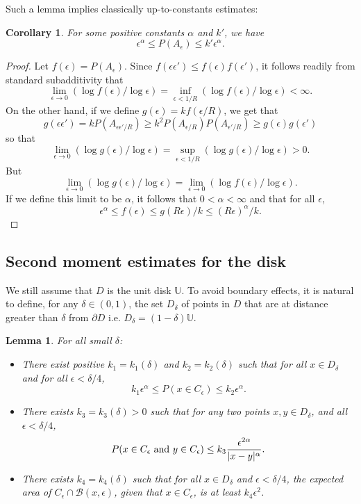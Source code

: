\documentclass[11pt]{article}
\newcommand{\U}{{\mathbb U}}
\newtheorem {lemma} [Theorem]    {Lemma}
\newtheorem {corollary}  [Theorem]    {Corollary}
\newcommand{\eps}{\epsilon}
\newcommand{\PP}{{ P}}
\newcommand{\pa}[1]{\PP (A_{#1})}
\newcommand{\B}{{\mathcal B}}
\begin{document}
Such a lemma implies classically up-to-constants estimates:

\begin{corollary}\label{pa_alpha_zero}
For some positive constants $\alpha$ and $k'$, we have
\begin{equation}
\eps^\alpha \le \PP (A_\eps) \le  k' \eps^\alpha. 
\end{equation}
\end{corollary}

\begin {proof}
Let $f(\eps) = \PP(A_\eps)$. Since $f( \eps \eps') \le f ( \eps) f( \eps')$, 
it follows readily from standard subadditivity that 
$$\lim_{\eps \to 0} (\log f( \eps) / \log \eps)= \inf_{\eps< 1/R} (\log f( \eps) / \log \eps) < \infty.$$
On the other hand, if we define $g (\eps) = k f ( \eps/R)$, we get that
$$ g ( \eps \eps') = k \pa{\eps \eps'/R} \ge k^2  \pa{\eps/R} \pa{\eps'/R} \ge g( \eps) g ( \eps')$$
so that 
$$\lim_{\eps \to 0} (\log g( \eps) / \log \eps)= \sup_{\eps< 1/R} (\log g( \eps) / \log \eps) >0.$$
But 
$$\lim_{\eps \to 0} (\log g( \eps) / \log \eps)=\lim_{\eps \to 0} (\log f( \eps) / \log \eps).$$
If we define this limit to be $\alpha$, it follows that $0 < \alpha < \infty$ and that for all $\eps$, 
$$ 
\eps^\alpha \le f( \eps) \le g(R \eps) / k \le (R \eps)^{\alpha} / k .$$
\end {proof}

 
\subsection {Second moment estimates for the disk}

We still assume that $D$ is the unit disk $\U$. To avoid boundary
effects, it is natural to define, for any $\delta \in (0,1)$, 
the set $D_\delta$ of points
in $D$ that are at distance greater than $\delta$ from $\partial D$ i.e. 
$D_ \delta= (1-\delta) \U$.

\begin{lemma}\label{pa_alpha}
For all small $\delta$: 
\begin {itemize}
\item
There exist positive $k_1=k_1 (\delta)$ and $k_2=k_2 (\delta)$ 
such that for all $x \in D_\delta$ and for all $\eps < \delta/4$,
\begin{equation}\label{moment1}
k_1 \eps^\alpha \le \PP(x \in C_\eps) \le k_2  \eps^\alpha.
\end{equation}
\item 
There exists $k_3=k_3 (\delta)>0$ such that 
for any two points $x, y \in D_\delta$,  and all $\eps < \delta/4$,
\begin{equation}\label{pa_alpha_2}
\PP(x \in C_\eps \hbox { and }  y \in C_\eps)
\le k_3 \frac { \eps^{2\alpha} }{ |x-y|^\alpha}.
\end{equation}
\item
There exists $k_4= k_4 (\delta)$ such that for all $x \in D_\delta$ 
and $\eps < \delta / 4$,
the expected area of $C_\eps \cap \B(x,\eps)$,
given that $x \in C_\eps$, is at least $k_4 \eps^2$.
\end {itemize}
\end{lemma}
\end{document}
